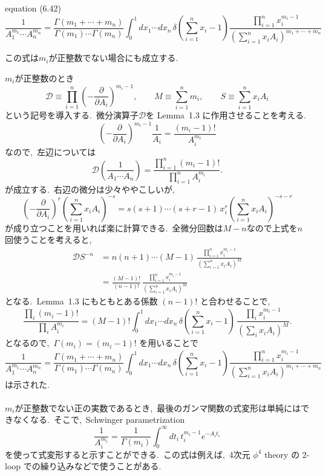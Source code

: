 \documentclass[uplatex,dvipdfmx,a4paper,11pt]{jsarticle}
\begin{document}
\begin{mylemma}{equation (6.42)}
\[
\frac{1}{A_1^{m_1}\cdots A_n^{m_n}}
=
\frac{\Gamma(m_1+\cdots +m_n)}{\Gamma(m_1)\cdots\Gamma(m_n)}
\int_0^1dx_1\cdots dx_n\,
\delta\!\left(\sum_{i=1}^n x_i-1\right)
\frac{\prod_{i=1}^n x_i^{m_i-1}}
{\left(\sum_{i=1}^n x_iA_i\right)^{m_1+\cdots +m_n}}
\]
\end{mylemma}
この式は$m_i$が正整数でない場合にも成立する.~
\begin{myproof}
  $m_i$が正整数のとき\\
\[
\mathcal D
\equiv
\prod_{i=1}^n
\left(-\frac{\partial}{\partial A_i}\right)^{m_i-1},\qquad
M\equiv\sum_{i=1}^n m_i,
\qquad
S\equiv\sum_{i=1}^n x_iA_i
\]
という記号を導入する.~微分演算子$\mathcal{D}$を Lemma~1.3 に作用させることを考える.
\[
\left(-\frac{\partial}{\partial A_i}\right)^{m_i-1}
\frac{1}{A_i}
=
\frac{(m_i-1)!}{A_i^{m_i}}
\]
なので,~左辺については
\[
\mathcal D\left(\frac{1}{A_1\cdots A_n}\right)
=
\frac{\prod_{i=1}^n(m_i-1)!}
{\prod_{i=1}^n A_i^{m_i}}.
\]
が成立する.~右辺の微分は少々ややこしいが,~
\[
\left(-\frac{\partial}{\partial A_i}\right)^r \left(\sum_{i=1}^n x_iA_i\right)^{-s}
=
s(s+1)\cdots(s+r-1)\,
x_i^r\left(\sum_{i=1}^n x_iA_i\right)^{-s-r}
\]
が成り立つことを用いれば楽に計算できる.~全微分回数は$M-n$なので上式を$n$回使うことを考えると,
\[
\begin{aligned}
\mathcal D S^{-n}
&=
n(n+1)\cdots(M-1)\,
\frac{\prod_{i=1}^n x_i^{m_i-1}}{\left(\sum_{i=1}^n x_iA_i\right)^M}\\
&=
\frac{(M-1)!}{(n-1)!}\,
\frac{\prod_{i=1}^n x_i^{m_i-1}}{\left(\sum_{i=1}^n x_iA_i\right)^M}
\end{aligned}
\]
となる.~Lemma~1.3 にもともとある係数 \((n-1)!\) と合わせることで,~
\[
\frac{\prod_i(m_i-1)!}{\prod_i A_i^{m_i}}
=
(M-1)!\int_0^1dx_1\cdots dx_n\,
\delta\!\left(\sum_{i=1}^n x_i-1\right)\,
\frac{\prod_i x_i^{m_i-1}}{(\sum_i x_iA_i)^M}.
\]
となるので,~\(\Gamma(m_i)=(m_i-1)!\) を用いることで
\[
\frac{1}{A_1^{m_1}\cdots A_n^{m_n}}
=
\frac{\Gamma(m_1+\cdots +m_n)}{\Gamma(m_1)\cdots\Gamma(m_n)}
\int_0^1dx_1\cdots dx_n\,
\delta\!\left(\sum_{i=1}^n x_i-1\right)
\frac{\prod_{i=1}^n x_i^{m_i-1}}
{\left(\sum_{i=1}^n x_iA_i\right)^{m_1+\cdots +m_n}}
\]
は示された.~\\\\
$m_i$が正整数でない正の実数であるとき,~最後のガンマ関数の式変形は単純にはできなくなる.~そこで,~Schwinger parametrization
\[
\frac{1}{A_i^{m_i}}
=
\frac{1}{\Gamma(m_i)}
\int_0^\infty dt_i\,
t_i^{m_i-1}e^{-A_it_i}
\]
を使って式変形すると示すことができる.~この式は例えば,~4次元 $\phi^4$ theory の 2-loop での繰り込みなどで使うことがある.
\end{myproof}
\end{document}
